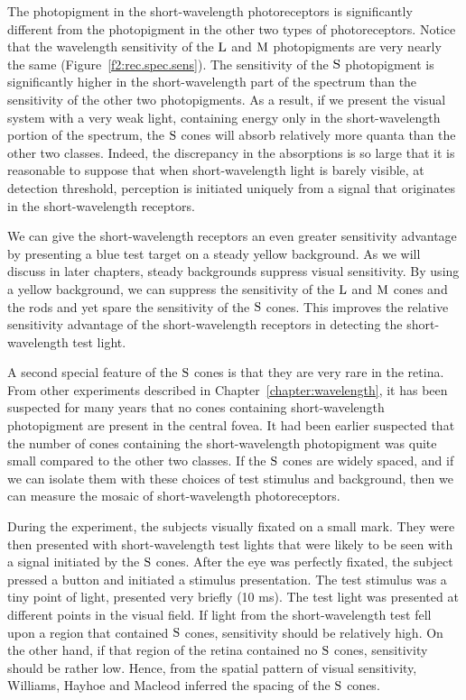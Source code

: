 The photopigment in the short-wavelength photoreceptors
is significantly different from the photopigment in the
other two types of photoreceptors.
Notice that the wavelength
sensitivity of the $\mbox{L}$ and $\mbox{M}$ photopigments
are very nearly the same (Figure~\ref{f2:rec.spec.sens}).
The sensitivity of the $\mbox{S}$ photopigment
is significantly higher in the short-wavelength part
of the spectrum than the sensitivity of
the other two photopigments.
As a result, if we present the visual system with a very weak
light, containing energy only in the short-wavelength portion
of the spectrum, the $\mbox{S}$ cones
will absorb relatively more quanta than the other two classes.
Indeed, the discrepancy in the absorptions is so large
that it is reasonable to suppose that when 
short-wavelength light is barely visible, at detection threshold,
perception is initiated uniquely from a signal that originates
in the short-wavelength receptors.
\nocite{BaylorNunnSchnapf}
\nocite{WilliamsHayhowMacLeod1981}

We can give the short-wavelength receptors an even
greater sensitivity advantage by presenting a blue test target
on a steady yellow background.
As we will discuss in later chapters,
steady backgrounds suppress visual sensitivity.
By using a yellow background, we can suppress
the sensitivity of the $\mbox{L}$ and $\mbox{M}$ cones
and the rods and yet
spare the sensitivity of the $\mbox{S}$ cones.
This improves the relative sensitivity advantage
of the short-wavelength receptors in detecting the
short-wavelength test light.

A second special feature of the $\mbox{S}$ cones
is that they are very rare in the retina.
From other experiments described in
Chapter~\ref{chapter:wavelength},
it has been suspected for many years that
no cones containing short-wavelength photopigment are present
in the central fovea.
It had been earlier suspected that the number of
cones containing the short-wavelength photopigment was quite small
compared to the other two classes.
If the $\mbox{S}$ cones are widely spaced,
and if we can isolate them with these choices of test
stimulus and background, then we can measure
the mosaic of short-wavelength photoreceptors.

During the experiment,
the subjects visually fixated on a small mark.
They were then presented
with short-wavelength test lights that were
likely to be seen with a signal initiated by the
$\mbox{S}$ cones.
After the eye was perfectly fixated,
the subject pressed a button and initiated a stimulus presentation.
The test stimulus was a tiny point of light,
presented very briefly (10 ms).
The test light was presented at different points in the visual
field.
If light from the short-wavelength test
fell upon a region that contained $\mbox{S}$ cones,
sensitivity should be relatively high.
On the other hand, if that region of the retina contained no
$\mbox{S}$ cones, sensitivity should be rather low.
Hence, from the spatial pattern of visual sensitivity,
Williams, Hayhoe and Macleod
inferred the spacing of the $\mbox{S}$ cones.


